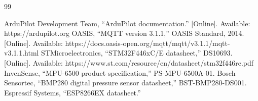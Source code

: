 \documentclass[12pt,a4paper]{report}
\begin{document}
\begin{thebibliography}{99}
 ArduPilot Development Team, ``ArduPilot documentation.'' [Online]. Available: https://ardupilot.org
 OASIS, ``MQTT version 3.1.1,'' OASIS Standard, 2014. [Online]. Available: https://docs.oasis-open.org/mqtt/mqtt/v3.1.1/mqtt-v3.1.1.html
 STMicroelectronics, ``STM32F446xC/E datasheet,'' DS10693. [Online]. Available: https://www.st.com/resource/en/datasheet/stm32f446re.pdf
 InvenSense, ``MPU-6500 product specification,'' PS-MPU-6500A-01.
 Bosch Sensortec, ``BMP280 digital pressure sensor datasheet,'' BST-BMP280-DS001.
 Espressif Systems, ``ESP8266EX datasheet.''
\end{thebibliography}
\end{document}
